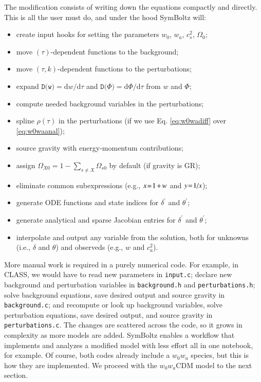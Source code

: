 \documentclass{aa}
\begin{document}
The modification consists of writing down the equations compactly and directly.
This is all the user must do, and under the hood SymBoltz will:
\begin{itemize}
\item create input hooks for setting the parameters $w_0$, $w_a$, $c_s^2$, $\Omega_{0}$;
\item move $(\tau)$-dependent functions to the background;
\item move $(\tau,k)$-dependent functions to the perturbations;
\item expand $\texttt{D(w)} = \mathrm{d}w/\mathrm{d}\tau$ and $\texttt{D($\Phi$)} = \mathrm{d}\Phi/\mathrm{d}\tau$ from $w$ and $\Phi$;
\item compute needed background variables in the perturbations;
\item spline $\rho(\tau)$ in the perturbations (if we use Eq. \eqref{eq:w0wadiff} over \eqref{eq:w0waanal});
\item source gravity with energy-momentum contributions;
\item assign $\Omega_{X0} = 1 - \sum_{s \neq {X}} \Omega_{s0}$ by default (if gravity is GR);
\item eliminate common subexpressions (e.g., $x\hspace{-2pt}=\hspace{-2pt}1\hspace{-1pt}+\hspace{-1pt}w$ and $y\hspace{-2pt}=\hspace{-2pt}1\hspace{-1pt}/\hspace{-1pt}x$);
\item generate ODE functions and state indices for $\delta^\prime$ and $\theta^\prime$;
\item generate analytical and sparse Jacobian entries for $\delta^\prime$ and $\theta^\prime$;
\item interpolate and output any variable from the solution, both for unknowns (i.e., $\delta$ and $\theta$) and observeds (e.g., $w$ and $c_a^2$).
\end{itemize}

More manual work is required in a purely numerical code.
For example, in CLASS, we would have to
read new parameters in \texttt{input.c};
declare new background and perturbation variables in \texttt{background.h} and \texttt{perturbations.h};
solve background equations, save desired output and source gravity in \texttt{background.c};
and recompute or look up background variables, solve perturbation equations, save desired output, and source gravity in \texttt{perturbations.c}.
The changes are scattered across the code, so it grows in complexity as more models are added.
SymBoltz enables a workflow that implements and analyzes a modified model with less effort all in one notebook, for example.
Of course, both codes already include a $w_0 w_a$ species, but this is how they are implemented.
We proceed with the $w_0 w_a \text{CDM}$ model to the next section.
\end{document}
